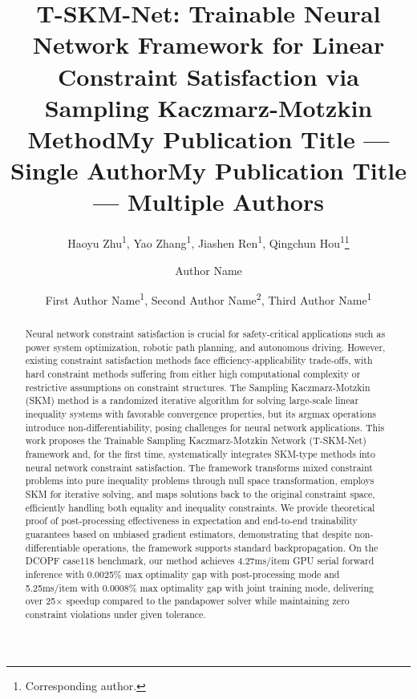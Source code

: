 \documentclass[letterpaper]{article} %
\title{T-SKM-Net: Trainable Neural Network Framework for Linear Constraint Satisfaction via Sampling Kaczmarz-Motzkin Method}
\author {
    Haoyu Zhu\textsuperscript{\rm 1},
    Yao Zhang\textsuperscript{\rm 1},
    Jiashen Ren\textsuperscript{\rm 1},
    Qingchun Hou\textsuperscript{\rm 1}\thanks{Corresponding author.}
}
\title{My Publication Title --- Single Author}
\author {
    Author Name
}
\title{My Publication Title --- Multiple Authors}
\author {
    First Author Name\textsuperscript{\rm 1},
    Second Author Name\textsuperscript{\rm 2},
    Third Author Name\textsuperscript{\rm 1}
}
\begin{document}
\maketitle

\begin{abstract}
Neural network constraint satisfaction is crucial for safety-critical applications such as power system optimization, robotic path planning, and autonomous driving. However, existing constraint satisfaction methods face efficiency-applicability trade-offs, with hard constraint methods suffering from either high computational complexity or restrictive assumptions on constraint structures. The Sampling Kaczmarz-Motzkin (SKM) method is a randomized iterative algorithm for solving large-scale linear inequality systems with favorable convergence properties, but its argmax operations introduce non-differentiability, posing challenges for neural network applications. This work proposes the Trainable Sampling Kaczmarz-Motzkin Network (T-SKM-Net) framework and, for the first time, systematically integrates SKM-type methods into neural network constraint satisfaction. The framework transforms mixed constraint problems into pure inequality problems through null space transformation, employs SKM for iterative solving, and maps solutions back to the original constraint space, efficiently handling both equality and inequality constraints. We provide theoretical proof of post-processing effectiveness in expectation and end-to-end trainability guarantees based on unbiased gradient estimators, demonstrating that despite non-differentiable operations, the framework supports standard backpropagation. On the DCOPF case118 benchmark, our method achieves 4.27ms/item GPU serial forward inference with 0.0025\% max optimality gap with post-processing mode and 5.25ms/item with 0.0008\% max optimality gap with joint training mode, delivering over 25$\times$ speedup compared to the pandapower solver while maintaining zero constraint violations under given tolerance.
\end{abstract}

\begin{links}
\end{links}
\end{document}
